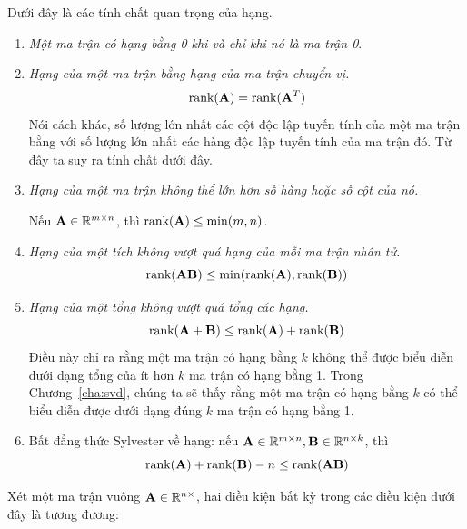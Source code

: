 Dưới đây là các tính chất quan trọng của hạng.
\begin{enumerate}

\item \textit{Một ma trận có hạng bằng 0 khi và chỉ khi nó là ma trận 0}.

\item \textit{Hạng của một ma trận bằng hạng của ma trận chuyển vị.}
$$\text{rank}(\mathbf{A}) = \text{rank}(\mathbf{A}^T)$$ Nói cách khác, số lượng lớn nhất các cột
độc lập tuyến tính của một ma trận bằng với số lượng lớn nhất các hàng
độc lập tuyến tính của ma trận đó. Từ đây ta suy ra tính chất dưới đây.

\item \textit{Hạng của một ma trận không thể lớn hơn số hàng hoặc số cột
của nó.}

Nếu $\mathbf{A} \in \mathbb{R}^{m \times n}$, thì $\text{rank}(\mathbf{A}) \leq \min(m, n)$.

\item \textit{Hạng của một tích không vượt quá hạng của mỗi ma trận nhân tử.}
$$\text{rank}(\mathbf{A}\mathbf{B}) \leq \min(\text{rank}(\mathbf{A}), \text{rank}(\mathbf{B}))$$

\item \textit{Hạng của một tổng không vượt quá tổng các hạng.}
\begin{equation}
\text{rank}(\mathbf{A} + \mathbf{B}) \leq \text{rank}(\mathbf{A}) + \text{rank}(\mathbf{B})
\end{equation}
Điều này chỉ ra rằng một ma trận có hạng bằng $k$ không thể được biểu diễn dưới
dạng tổng của ít hơn $k$ ma trận có hạng bằng 1. Trong Chương~\ref{cha:svd},
chúng ta sẽ thấy rằng một ma trận có hạng bằng $k$ có thể biểu diễn được
dưới dạng đúng $k$ ma trận có hạng bằng 1. %


\item Bất đẳng thức Sylvester về hạng: nếu $\mathbf{A} \in \mathbb{R}^{m\times n}, \mathbf{B} \in
\mathbb{R}^{n \times k}$, thì $$\text{rank}{(\mathbf{A})} + \text{rank}{(\mathbf{B})} - n \leq \text{rank}{(\mathbf{A}\mathbf{B})}$$


\end{enumerate}
Xét một ma trận vuông $\mathbf{A} \in \mathbb{R}^{n\times }$, hai điều kiện bất kỳ trong các điều kiện dưới đây là tương đương:




